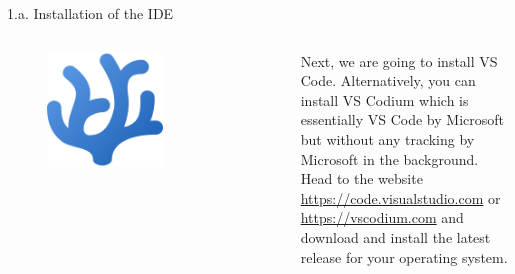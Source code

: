 \documentclass[aspectratio=1610,12pt]{beamer}
\begin{document}
\begin{frame}[fragile]{1.a. Installation of the IDE}
	\begin{columns}[onlytextwidth]
    	\center
    		\begin{figure}
    			\includegraphics[width=0.6\textwidth]{images/codium_cnl.png}
       		\end{figure}
    		Next, we are going to install VS Code. Alternatively, you can install VS Codium which is essentially VS Code by Microsoft but without any tracking by Microsoft in the background.\\
    		\vspace{0.2cm}
    		Head to the website \url{https://code.visualstudio.com} or \url{https://vscodium.com} and download and install the latest release for your operating system.\\
    		\vspace{0.1cm}	
    \end{columns}
\end{frame}
\end{document}
